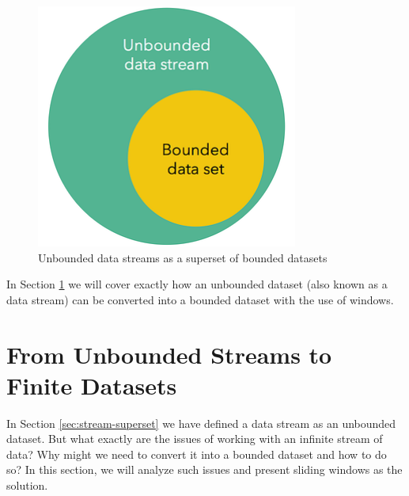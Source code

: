 \begin{figure}[!htb]
    \begin{center}
      \includegraphics[scale=0.5]{figures/unbounded-superset-bounded.png}
      \caption{Unbounded data streams as a superset of bounded datasets}
      \label{fig:unbounded-bounded-superset}
    \end{center}
\end{figure}


In Section \ref{sec:windows} we will cover exactly how an unbounded dataset (also known as a data stream) can be converted into a bounded dataset with the use of windows.

\section{From Unbounded Streams to Finite Datasets} \label{sec:windows}

In Section \ref{sec:stream-superset} we have defined a data stream as an unbounded dataset. But what exactly are the issues of working with an infinite stream of data? Why might we need to convert it into a bounded dataset and how to do so? In this section, we will analyze such issues and present sliding windows as the solution.


